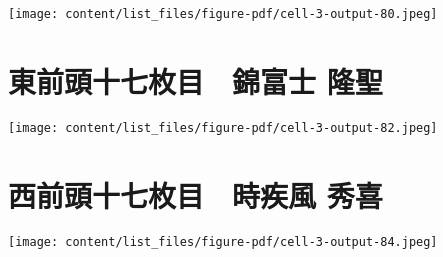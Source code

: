 \documentclass[
  letterpaper,
]{bxjsbook}
\begin{document}
\texttt{[image: content/list\_files/figure-pdf/cell-3-output-80.jpeg]}

\section{東前頭十七枚目　錦富士
隆聖}\label{ux6771ux524dux982dux5341ux4e03ux679aux76ee-ux9326ux5bccux58eb-ux9686ux8056}

\texttt{[image: content/list\_files/figure-pdf/cell-3-output-82.jpeg]}

\section{西前頭十七枚目　時疾風
秀喜}\label{ux897fux524dux982dux5341ux4e03ux679aux76ee-ux6642ux75beux98a8-ux79c0ux559c}

\texttt{[image: content/list\_files/figure-pdf/cell-3-output-84.jpeg]}
\end{document}
